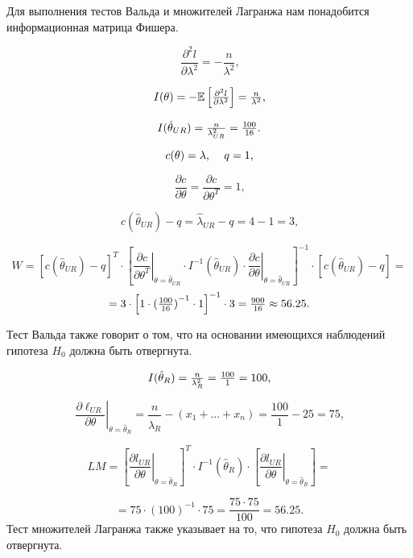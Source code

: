 \begin{problem}
\begin{sol}
Для выполнения тестов Вальда и множителей Лагранжа нам понадобится информационная матрица Фишера.

\[
\frac{{{\partial ^2}l}}{{\partial {\lambda ^2}}} =  - \frac{n}{{{\lambda ^2}}} \text{,}
\]

\[
I(\theta) =  - \mathbb{E}\left[ {{\textstyle{{{\partial ^2}l} \over {\partial {\lambda ^2}}}}} \right] = {\textstyle{n \over {{\lambda ^2}}}} \text{,}
\]

\[
I({\hat \theta_{UR}}) = {\textstyle{n \over {\lambda _{UR}^2}}} = {\textstyle{{100} \over {16}}} \text{.}
\]

\[
    c(\theta) = \lambda \text{, \quad} q = 1 \text{,}
\]

\[
\frac{{\partial c}}{{\partial \theta }} = \frac{{\partial c}}{{\partial {\theta ^T}}} = 1 \text{,}
\]

\[
c({\hat \theta _{UR}}) - q = {\hat \lambda _{UR}} - q = 4 - 1 = 3 \text{,}
\]


\[
W = {\left[ {c({{\hat \theta }_{UR}}) - q} \right]^T} \cdot {\left[ {{{\left. {\frac{{\partial c}}{{\partial {\theta ^T}}}} \right|}_{\theta  = {{\hat \theta }_{UR}}}} \cdot {I^{ - 1}}({{\hat \theta }_{UR}}) \cdot {{\left. {\frac{{\partial c}}{{\partial \theta }}} \right|}_{\theta  = {{\hat \theta }_{UR}}}}} \right]^{ - 1}} \cdot \left[ {c({{\hat \theta }_{UR}}) - q} \right] =
\]
\[
= 3 \cdot {\left[ {1 \cdot {{({\textstyle{{100} \over {16}}})}^{ - 1}} \cdot 1} \right]^{ - 1}} \cdot 3 = {\textstyle{{900} \over {16}}} \approx {{56}}{{.25}} \text{.}
\]

Тест Вальда также говорит о том, что на основании имеющихся наблюдений гипотеза $H_0$ должна быть отвергнута.

\[
I({\hat \theta _R}) = {\textstyle{n \over {\lambda _R^2}}} = {\textstyle{{100} \over 1}} = 100 \text{,}
\]

\[
{\left. {\frac{{\partial {\ell_{UR}}}}{{\partial \theta }}} \right|_{\theta  = {{\hat \theta }_R}}} = \frac{n}{{\hat \lambda }_R} - ({x_1} +  \ldots  + {x_n}) = \frac{{100}}{1} - 25 = 75 \text{,}
\]

\[
LM = {\left[ {{{\left. {\frac{{\partial {l_{UR}}}}{{\partial \theta }}} \right|}_{\theta  = {{\hat \theta }_R}}}} \right]^T} \cdot {I^{ - 1}}({\hat \theta _R}) \cdot \left[ {{{\left. {\frac{{\partial {l_{UR}}}}{{\partial \theta }}} \right|}_{\theta  = {{\hat \theta }_R}}}} \right] =
\]

\[
= 75 \cdot {(100)^{ - 1}} \cdot 75 = \frac{{75 \cdot 75}}{{100}} = {{56}}{{.25}} \text{.}
\]
Тест множителей Лагранжа также указывает на то, что гипотеза $H_0$ должна быть отвергнута.

\end{sol}
\end{problem}



